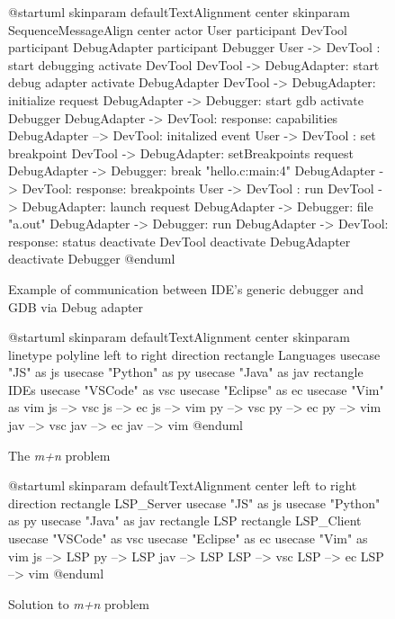 \ifdaGdb%
\begin{figure}
    \begin{plantuml}
    @startuml
      skinparam defaultTextAlignment center
      skinparam SequenceMessageAlign center
      actor User
      participant DevTool
      participant DebugAdapter
      participant Debugger
      User -> DevTool : start debugging
      activate DevTool
      DevTool -> DebugAdapter: start debug adapter
      activate DebugAdapter
      DevTool -> DebugAdapter: initialize request
      DebugAdapter -> Debugger: start gdb
      activate Debugger
      DebugAdapter -> DevTool: response: capabilities
      DebugAdapter --> DevTool: initalized event
      User -> DevTool : set breakpoint
      DevTool -> DebugAdapter: setBreakpoints request
      DebugAdapter -> Debugger: break "hello.c:main:4"
      DebugAdapter -> DevTool: response: breakpoints
      User -> DevTool : run
      DevTool -> DebugAdapter: launch request
      DebugAdapter -> Debugger: file "a.out"
      DebugAdapter -> Debugger: run
      DebugAdapter -> DevTool: response: status
      deactivate DevTool
      deactivate DebugAdapter
      deactivate Debugger
    @enduml
    \end{plantuml}
    \caption{Example of communication between IDE's generic debugger and GDB via Debug adapter \cite{dap}}
    \label{daGdb}
\end{figure}
\fi%

\ifmnProb%
\begin{figure}
    \begin{plantuml}
      @startuml
      skinparam defaultTextAlignment center
      skinparam linetype polyline
      left to right direction
      rectangle Languages {
        usecase "JS" as js
        usecase "Python" as py
        usecase "Java" as jav
      }
      rectangle IDEs {
        usecase "VSCode" as vsc
        usecase "Eclipse" as ec
        usecase "Vim" as vim
      }
      js --> vsc
      js --> ec
      js --> vim
      py --> vsc
      py --> ec
      py --> vim
      jav --> vsc
      jav --> ec
      jav --> vim
      @enduml
    \end{plantuml}
    \caption{The {\it m+n} problem\cite{vsclspextman}}
    \label{mnProb}
\end{figure}
\fi%

\ifsolMnProb%
\begin{figure}
    \begin{plantuml}
      @startuml
      skinparam defaultTextAlignment center
      left to right direction
      rectangle LSP_Server {
        usecase "JS" as js
        usecase "Python" as py
        usecase "Java" as jav
      }
      rectangle LSP
      rectangle LSP_Client {
        usecase "VSCode" as vsc
        usecase "Eclipse" as ec
        usecase "Vim" as vim
      }
      js --> LSP
      py --> LSP
      jav --> LSP
      LSP --> vsc
      LSP --> ec
      LSP --> vim
      @enduml
    \end{plantuml}
    \caption{Solution to {\it m+n} problem\cite{vsclspextman}}
    \label{solMnProb}
\end{figure}
\fi%


